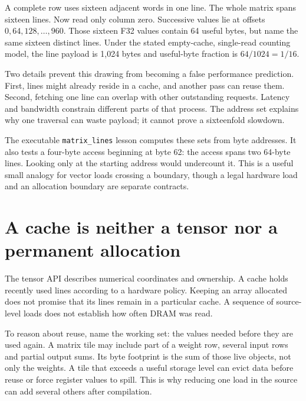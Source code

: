 A complete row uses sixteen adjacent words in one line. The
whole matrix spans sixteen lines. Now read only column zero.
Successive values lie at offsets $0,64,128,\ldots,960$.
Those sixteen F32 values contain 64 useful bytes, but name the
same sixteen distinct lines. Under the stated empty-cache,
single-read counting model, the line payload is 1,024 bytes
and useful-byte fraction is $64/1024=1/16$.


Two details prevent this drawing from becoming a false performance
prediction. First, lines might already reside in a cache, and
another pass can reuse them. Second, fetching one line can overlap
with other outstanding requests. Latency and bandwidth constrain
different parts of that process. The address set explains why
one traversal can waste payload; it cannot prove a sixteenfold
slowdown.

The executable \texttt{matrix\_lines} lesson computes these sets
from byte addresses. It also tests a four-byte access beginning
at byte 62: the access spans two 64-byte lines. Looking only at
the starting address would undercount it. This is a useful small
analogy for vector loads crossing a boundary, though a legal
hardware load and an allocation boundary are separate contracts.

\section{A cache is neither a tensor nor a permanent allocation}
The tensor API describes numerical coordinates and ownership.
A cache holds recently used lines according to a hardware
policy. Keeping an array allocated does not promise that its
lines remain in a particular cache. A sequence of source-level
loads does not establish how often DRAM was read.

To reason about reuse, name the working set: the values needed
before they are used again. A matrix tile may include part
of a weight row, several input rows and partial output sums.
Its byte footprint is the sum of those live objects, not only
the weights. A tile that exceeds a useful storage level can
evict data before reuse or force register values to spill.
This is why reducing one load in the source can add several
others after compilation.

